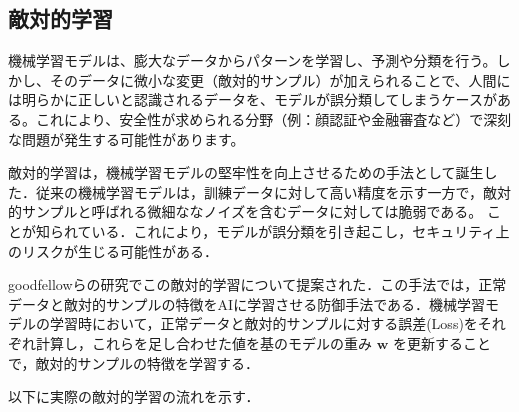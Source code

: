 
\subsection{敵対的学習}
機械学習モデルは、膨大なデータからパターンを学習し、予測や分類を行う。しかし、そのデータに微小な変更（敵対的サンプル）が加えられることで、人間には明らかに正しいと認識されるデータを、モデルが誤分類してしまうケースがある。これにより、安全性が求められる分野（例：顔認証や金融審査など）で深刻な問題が発生する可能性があります。

敵対的学習は，機械学習モデルの堅牢性を向上させるための手法として誕生した．従来の機械学習モデルは，訓練データに対して高い精度を示す一方で，敵対的サンプルと呼ばれる微細ななノイズを含むデータに対しては脆弱である。
ことが知られている．これにより，モデルが誤分類を引き起こし，セキュリティ上のリスクが生じる可能性がある．

goodfellowらの研究\cite{goodfellow2015explaining}でこの敵対的学習について提案された．この手法では，正常データと敵対的サンプルの特徴をAIに学習させる防御手法である．機械学習モデルの学習時において，正常データと敵対的サンプルに対する誤差(Loss)をそれぞれ計算し，これらを足し合わせた値を基のモデルの重み $\bm{w}$ を更新することで，敵対的サンプルの特徴を学習する．

以下に実際の敵対的学習の流れを示す．\cite{MBSD-AdversarialTraining}

